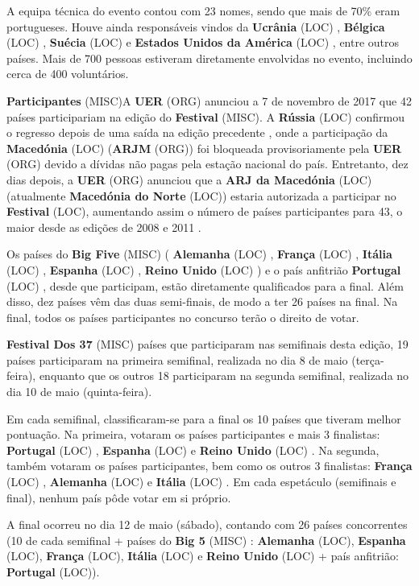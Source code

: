 \documentclass[12pt,a4paper]{article}
\begin{document}
A equipa técnica do evento contou com 23 nomes, sendo que mais de 70\% eram portugueses. Houve ainda responsáveis vindos da \textbf{Ucrânia} (LOC) , \textbf{Bélgica} (LOC) , \textbf{Suécia} (LOC) e \textbf{Estados Unidos da América} (LOC) , entre outros países. Mais de 700 pessoas estiveram diretamente envolvidas no evento, incluindo cerca de 400 voluntários.



\textbf{Participantes} (MISC)A \textbf{UER} (ORG) anunciou a 7 de novembro de 2017 que 42 países participariam na edição do \textbf{Festival} (MISC). A \textbf{Rússia} (LOC) confirmou o regresso depois de uma saída na edição precedente , onde a participação da \textbf{Macedónia} (LOC) (\textbf{ARJM} (ORG)) foi bloqueada provisoriamente pela \textbf{UER} (ORG) devido a dívidas não pagas pela estação nacional do país. Entretanto, dez dias depois, a \textbf{UER} (ORG) anunciou que a \textbf{ARJ da Macedónia} (LOC) (atualmente \textbf{Macedónia do Norte} (LOC)) estaria autorizada a participar no \textbf{Festival} (LOC), aumentando assim o número de países participantes para 43, o maior desde as edições de 2008 e 2011 .

Os países do \textbf{Big Five} (MISC) ( \textbf{Alemanha} (LOC) , \textbf{França} (LOC) , \textbf{Itália} (LOC) , \textbf{Espanha} (LOC) , \textbf{Reino Unido} (LOC) ) e o país anfitrião \textbf{Portugal} (LOC) , desde que participam, estão diretamente qualificados para a final. Além disso, dez países vêm das duas semi-finais, de modo a ter 26 países na final. Na final, todos os países participantes no concurso terão o direito de votar.



\textbf{Festival Dos 37} (MISC) países que participaram nas semifinais desta edição, 19 países participaram na primeira semifinal, realizada no dia 8 de maio (terça-feira), enquanto que os outros 18 participaram na segunda semifinal, realizada no dia 10 de maio (quinta-feira).

Em cada semifinal, classificaram-se para a final os 10 países que tiveram melhor pontuação. Na primeira, votaram os países participantes e mais 3 finalistas: \textbf{Portugal} (LOC) , \textbf{Espanha} (LOC) e \textbf{Reino Unido} (LOC) . Na segunda, também votaram os países participantes, bem como os outros 3 finalistas: \textbf{França} (LOC) , \textbf{Alemanha} (LOC) e \textbf{Itália} (LOC) . Em cada espetáculo (semifinais e final), nenhum país pôde votar em si próprio.

A final ocorreu no dia 12 de maio (sábado), contando com 26 países concorrentes (10 de cada semifinal + países do \textbf{Big 5} (MISC) : \textbf{Alemanha} (LOC), \textbf{Espanha} (LOC), \textbf{França} (LOC), \textbf{Itália} (LOC) e \textbf{Reino Unido} (LOC) + país anfitrião: \textbf{Portugal} (LOC)).
\end{document}

